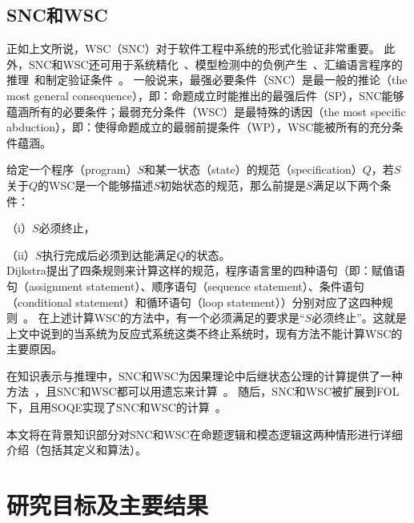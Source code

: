 \subsection{SNC和WSC}


正如上文所说，WSC（SNC）对于软件工程中系统的形式化验证非常重要。
此外，SNC和WSC还可用于系统精化~\cite{woodcock1990refinement}、模型检测中的负例产生~\cite{dailler2018instrumenting}、汇编语言程序的推理~\cite{legato2002weakest}和制定验证条件~\cite{DBLP:journals/ipl/Leino05}。
一般说来，最强必要条件（SNC）是最一般的推论（the most general consequence），即：命题成立时能推出的最强后件（SP），SNC能够蕴涵所有的必要条件；最弱充分条件（WSC）是最特殊的诱因（the most specific abduction），即：使得命题成立的最弱前提条件（WP），WSC能被所有的充分条件蕴涵。

给定一个程序（program）$S$和某一状态（state）的规范（specification）$Q$，若$S$关于$Q$的WSC是一个能够描述$S$初始状态的规范，那么前提是$S$满足以下两个条件：

（i）$S$必须终止，

（ii）$S$执行完成后必须到达能满足$Q$的状态。\\
Dijkstra提出了四条规则来计算这样的规范，程序语言里的四种语句（即：赋值语句（assignment statement）、顺序语句（sequence statement）、条件语句（conditional statement）和循环语句（loop statement））分别对应了这四种规则~\cite{DBLP:journals/cacm/Dijkstra75}。
在上述计算WSC的方法中，有一个必须满足的要求是“$S$必须终止”。这就是上文中说到的当系统为反应式系统这类不终止系统时，现有方法不能计算WSC的主要原因。



在知识表示与推理中，SNC和WSC为因果理论中后继状态公理的计算提供了一种方法~\cite{DBLP:journals/jair/Lin03}，且SNC和WSC都可以用遗忘来计算~\cite{DBLP:journals/ai/Lin01,DBLP:conf/ijcai/DohertyLS01}。
随后，SNC和WSC被扩展到FOL下，且用SOQE实现了SNC和WSC的计算~\cite{DBLP:conf/ijcai/DohertyLS01}。

本文将在背景知识部分对SNC和WSC在命题逻辑和模态逻辑这两种情形进行详细介绍（包括其定义和算法）。






\section{研究目标及主要结果}

